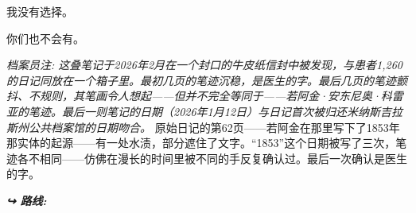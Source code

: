 \noindent 我没有选择。

\noindent 你们也不会有。

\noindent \textit{档案员注: 这叠笔记于2026年2月在一个封口的牛皮纸信封中被发现，与患者1,260的日记同放在一个箱子里。最初几页的笔迹沉稳，是医生的字。最后几页的笔迹颤抖、不规则，其笔画令人想起——但并不完全等同于——若阿金·安东尼奥·科雷亚的笔迹。最后一则笔记的日期（2026年1月12日）与日记首次被归还米纳斯吉拉斯州公共档案馆的日期吻合。}
\noindent 原始日记的第62页——若阿金在那里写下了1853年那实体的起源——有一处水渍，部分遮住了文字。\textquotedblleft{}1853\textquotedblright{}这个日期被写了三次，笔迹各不相同——仿佛在漫长的时间里被不同的手反复确认过。最后一次确认是医生的字。

\vspace{0.5em}
\noindent\textit{\textbf{↪ 路线:}  \rotasep {} \rotasep {}}

